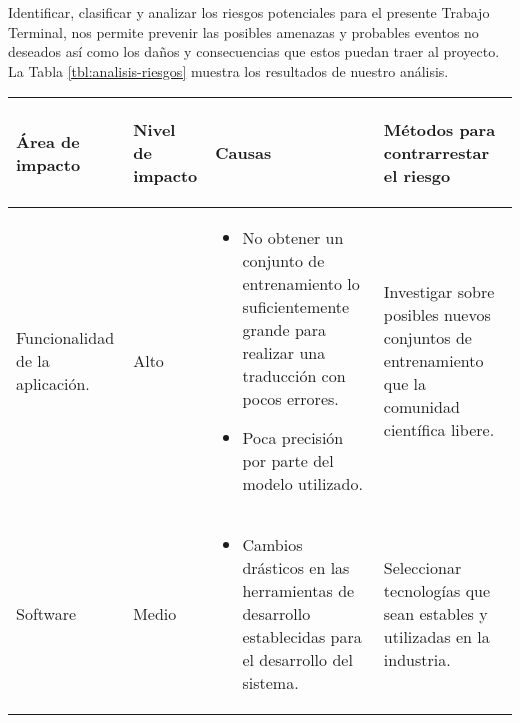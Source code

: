 Identificar, clasificar y analizar los riesgos potenciales para el presente Trabajo Terminal, nos permite prevenir las posibles amenazas y probables eventos no deseados así como los daños y consecuencias que estos puedan traer al proyecto. La Tabla \ref{tbl:analisis-riesgos} muestra los resultados de nuestro análisis. \\

\begin{center}
    \begin{longtable}{|J{2.5cm}|J{2cm}|J{5cm}|J{5cm}|}
    
        \hline
        \begin{center}
            \textbf{Área de impacto}
        \end{center}                &
        \begin{center}
            \textbf{Nivel de impacto}
        \end{center}                &
        \begin{center}
            \textbf{Causas} 
        \end{center}                &
        \begin{center}
            \textbf{Métodos para contrarrestar el riesgo}
        \end{center} \\ 
        
        \hline
        Funcionalidad de la aplicación.         &
        \begin{center}
            Alto
        \end{center}                            &
        \begin{itemize}
            \item No obtener un conjunto de entrenamiento lo suficientemente grande para realizar una traducción con pocos errores.
            \item Poca precisión por parte del modelo utilizado.
        \end{itemize}                           &
        Investigar sobre posibles nuevos conjuntos de entrenamiento que la comunidad científica libere. \\
        
        \hline
        Software                                &
        \begin{center}
            Medio
        \end{center}                            &
        \begin{itemize}
            \item Cambios drásticos en las herramientas de desarrollo establecidas para el desarrollo del sistema.
        \end{itemize}                           &
        Seleccionar tecnologías que sean estables y utilizadas en la industria. \\
        

\end{longtable}
\end{center}
